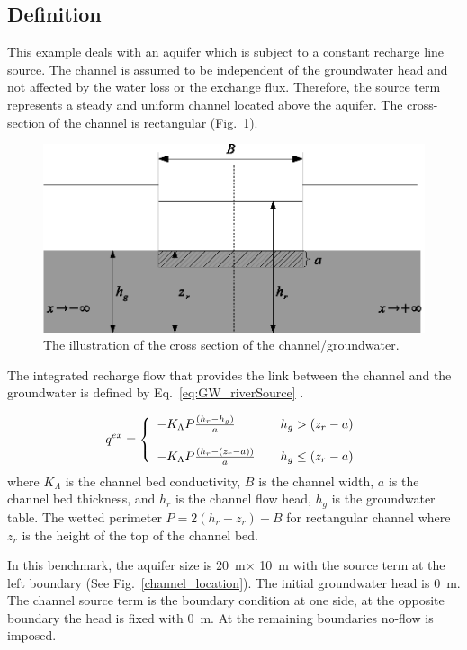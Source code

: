 \subsection{Definition}
This example deals with an aquifer which is subject to a constant recharge line source. The channel is assumed to be independent of the groundwater head and not affected by the water loss or the exchange flux. Therefore, the source term represents a steady and uniform channel located above the aquifer. The cross-section of the channel is rectangular (Fig.~\ref{river_groundwater}). 

\begin{figure} [htb!]
 \centering
\includegraphics[width=0.6\columnwidth] {Chapter5/figure/river_groundwater.eps}
\caption{The illustration of the cross section of the channel/groundwater.}
 \label{river_groundwater}
\end{figure}

The integrated recharge flow that provides the link between the channel and the groundwater is defined by Eq.~\ref{eq:GW_riverSource} \cite{Gunduz2005216}.

\begin{eqnarray}
q^{ex} =  \left\{
  \begin{array}{l l}
    -K_{\Lambda}{P}\frac{(h_r - h_g)}{a} & \quad \text{$h_g>(z_r-a)$}\\
    \\
    -K_{\Lambda}{P}\frac{(h_r - (z_r-a))}{a} & \quad \text{$h_g\leq(z_r-a)$}\\
  \end{array} \right. 
\label{eq:GW_riverSource}
\end{eqnarray}
%
where $K_{\Lambda}$ is the channel bed conductivity, $B$ is the channel width, $a$ is the channel bed thickness, and $h_r$ is the channel flow head, $h_g$ is the groundwater table. The wetted perimeter $P= 2 (h_r-z_r) + B$ for rectangular channel where $z_r$ is the height of the top of the channel bed.

In this benchmark, the aquifer size is 20~m$\times$ 10~m with the source term at the left boundary (See Fig.~\ref{channel_location}). The initial groundwater head is 0~m. The channel source term is the boundary condition at one side, at the opposite boundary the head is fixed with 0~m. At the remaining boundaries no-flow is imposed.

